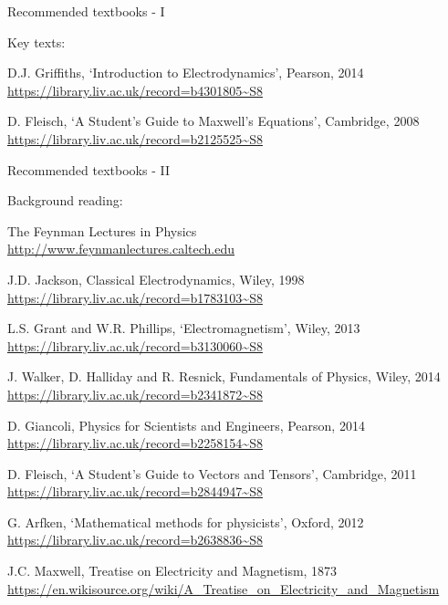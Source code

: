 %
%
%

\begin{frame}{Recommended textbooks - I}

Key texts:\\
\begin{itemize}
{\footnotesize
    \item D.J. Griffiths, `Introduction to Electrodynamics', Pearson, 2014\\
          {\scriptsize \color{blue} \url{https://library.liv.ac.uk/record=b4301805~S8}}
    \item D. Fleisch, `A Student's Guide to Maxwell's Equations', Cambridge, 2008\\
          {\scriptsize \color{blue} \url{https://library.liv.ac.uk/record=b2125525~S8}}\\
}
\end{itemize}

\end{frame}


\begin{frame}{Recommended textbooks - II}

Background reading:
\begin{itemize}
{\footnotesize
    \item The Feynman Lectures in Physics\\
          {\scriptsize \color{blue} \url{http://www.feynmanlectures.caltech.edu}}
    \item J.D. Jackson, Classical Electrodynamics, Wiley, 1998
          {\scriptsize \color{blue} \url{https://library.liv.ac.uk/record=b1783103~S8}}
    \item L.S. Grant and W.R. Phillips, `Electromagnetism', Wiley, 2013\\
          {\scriptsize \color{blue} \url{https://library.liv.ac.uk/record=b3130060~S8}}
    \item J. Walker, D. Halliday and R. Resnick, Fundamentals of Physics, Wiley, 2014\\
          {\scriptsize \color{blue} \url{https://library.liv.ac.uk/record=b2341872~S8}}
    \item D. Giancoli, Physics for Scientists and Engineers, Pearson, 2014\\
          {\scriptsize \color{blue} \url{https://library.liv.ac.uk/record=b2258154~S8}}
    \item D. Fleisch, `A Student's Guide to Vectors and Tensors', Cambridge, 2011\\
          {\scriptsize \color{blue} \url{https://library.liv.ac.uk/record=b2844947~S8}}
    \item G. Arfken, `Mathematical methods for physicists', Oxford, 2012\\
          {\scriptsize \color{blue} \url{https://library.liv.ac.uk/record=b2638836~S8}}
    \item J.C. Maxwell, Treatise on Electricity and Magnetism, 1873
          {\scriptsize \color{blue} \url{https://en.wikisource.org/wiki/A_Treatise_on_Electricity_and_Magnetism}}\\
}
\end{itemize}

\end{frame}


